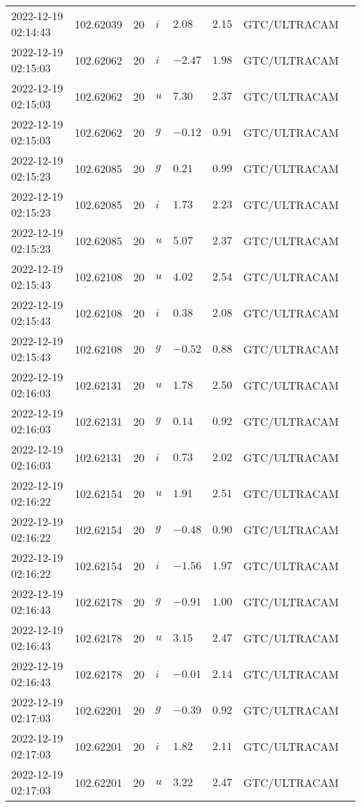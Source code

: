 \documentclass{nature_plusfigure}
\begin{document}
\begin{supplement}
\begin{center}
\begin{longtable}{llllllll}
2022-12-19 02:14:43 & 102.62039 & 20 & $i$ & $2.08$ & $2.15$ & GTC/ULTRACAM &  \\ 
2022-12-19 02:15:03 & 102.62062 & 20 & $i$ & $-2.47$ & $1.98$ & GTC/ULTRACAM &  \\ 
2022-12-19 02:15:03 & 102.62062 & 20 & $u$ & $7.30$ & $2.37$ & GTC/ULTRACAM &  \\ 
2022-12-19 02:15:03 & 102.62062 & 20 & $g$ & $-0.12$ & $0.91$ & GTC/ULTRACAM &  \\ 
2022-12-19 02:15:23 & 102.62085 & 20 & $g$ & $0.21$ & $0.99$ & GTC/ULTRACAM &  \\ 
2022-12-19 02:15:23 & 102.62085 & 20 & $i$ & $1.73$ & $2.23$ & GTC/ULTRACAM &  \\ 
2022-12-19 02:15:23 & 102.62085 & 20 & $u$ & $5.07$ & $2.37$ & GTC/ULTRACAM &  \\ 
2022-12-19 02:15:43 & 102.62108 & 20 & $u$ & $4.02$ & $2.54$ & GTC/ULTRACAM &  \\ 
2022-12-19 02:15:43 & 102.62108 & 20 & $i$ & $0.38$ & $2.08$ & GTC/ULTRACAM &  \\ 
2022-12-19 02:15:43 & 102.62108 & 20 & $g$ & $-0.52$ & $0.88$ & GTC/ULTRACAM &  \\ 
2022-12-19 02:16:03 & 102.62131 & 20 & $u$ & $1.78$ & $2.50$ & GTC/ULTRACAM &  \\ 
2022-12-19 02:16:03 & 102.62131 & 20 & $g$ & $0.14$ & $0.92$ & GTC/ULTRACAM &  \\ 
2022-12-19 02:16:03 & 102.62131 & 20 & $i$ & $0.73$ & $2.02$ & GTC/ULTRACAM &  \\ 
2022-12-19 02:16:22 & 102.62154 & 20 & $u$ & $1.91$ & $2.51$ & GTC/ULTRACAM &  \\ 
2022-12-19 02:16:22 & 102.62154 & 20 & $g$ & $-0.48$ & $0.90$ & GTC/ULTRACAM &  \\ 
2022-12-19 02:16:22 & 102.62154 & 20 & $i$ & $-1.56$ & $1.97$ & GTC/ULTRACAM &  \\ 
2022-12-19 02:16:43 & 102.62178 & 20 & $g$ & $-0.91$ & $1.00$ & GTC/ULTRACAM &  \\ 
2022-12-19 02:16:43 & 102.62178 & 20 & $u$ & $3.15$ & $2.47$ & GTC/ULTRACAM &  \\ 
2022-12-19 02:16:43 & 102.62178 & 20 & $i$ & $-0.01$ & $2.14$ & GTC/ULTRACAM &  \\ 
2022-12-19 02:17:03 & 102.62201 & 20 & $g$ & $-0.39$ & $0.92$ & GTC/ULTRACAM &  \\ 
2022-12-19 02:17:03 & 102.62201 & 20 & $i$ & $1.82$ & $2.11$ & GTC/ULTRACAM &  \\ 
2022-12-19 02:17:03 & 102.62201 & 20 & $u$ & $3.22$ & $2.47$ & GTC/ULTRACAM &  \\ 

\end{longtable}
\end{center}
\end{supplement}
\end{document}
